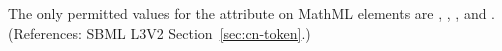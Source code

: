 The only permitted values for the attribute  on MathML
 elements are , , , and
.  (References: SBML L3V2 Section~\ref{sec:cn-token}.)
